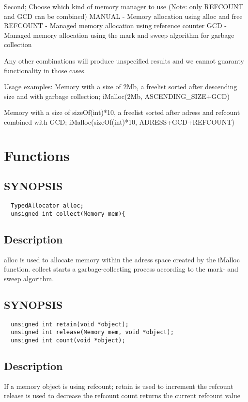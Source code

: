 \documentclass{article}
\begin{document}
Second; Choose which kind of memory manager to use (Note: only REFCOUNT and GCD can be combined)
MANUAL -  Memory allocation using alloc and free
REFCOUNT - Managed memory allocation using reference counter
GCD - Managed memory allocation using the mark and sweep algorithm for garbage collection

Any other combinations will produce unspecified results and we cannot guaranty functionality
in those cases.

Usage examples:
Memory with a size of 2Mb, a freelist sorted after descending size and with garbage collection;
iMalloc(2Mb, ASCENDING\_SIZE+GCD)

Memory with a size of sizeOf(int)*10, a freelist sorted after adress and refcount combined with GCD;
iMalloc(sizeOf(int)*10, ADRESS+GCD+REFCOUNT)


\section{Functions}
\subsection{SYNOPSIS}
\begin{verbatim}
  TypedAllocator alloc;
  unsigned int collect(Memory mem){
\end{verbatim}
\subsection*{Description}
alloc is used to allocate memory within the adress space created by the iMalloc function.
collect starts a garbage-collecting process according to the mark- and sweep algorithm.

\subsection{SYNOPSIS}
\begin{verbatim}
  unsigned int retain(void *object);
  unsigned int release(Memory mem, void *object);
  unsigned int count(void *object);
\end{verbatim}
\subsection*{Description}
If a memory object is using refcount;
  retain is used to increment the refcount
  release is used to decrease the refcount
  count returns the current refcount value
\end{document}

